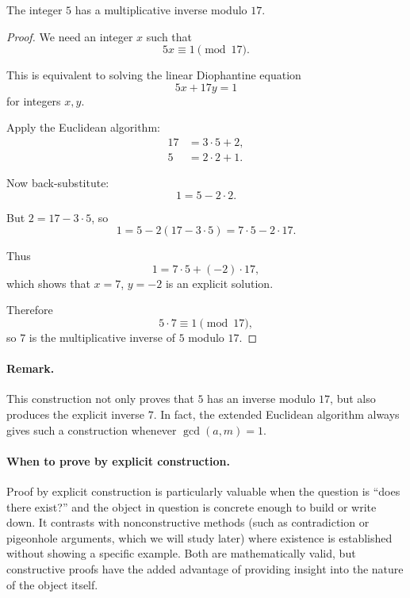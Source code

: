 \begin{theorem}
The integer $5$ has a multiplicative inverse modulo $17$.
\end{theorem}

\begin{proof}
We need an integer $x$ such that
\[
5x \equiv 1 \pmod{17}.
\]

This is equivalent to solving the linear Diophantine equation
\[
5x + 17y = 1
\]
for integers $x,y$.

Apply the Euclidean algorithm:
\begin{align*}
17 &= 3\cdot 5 + 2, \\
5  &= 2\cdot 2 + 1.
\end{align*}

Now back-substitute:
\[
1 = 5 - 2\cdot 2.
\]

But $2 = 17 - 3\cdot 5$, so
\[
1 = 5 - 2(17 - 3\cdot 5) = 7\cdot 5 - 2\cdot 17.
\]

Thus
\[
1 = 7\cdot 5 + (-2)\cdot 17,
\]
which shows that $x=7$, $y=-2$ is an explicit solution.

Therefore
\[
5\cdot 7 \equiv 1 \pmod{17},
\]
so $7$ is the multiplicative inverse of $5$ modulo $17$.
\end{proof}

\paragraph{Remark.}
This construction not only proves that $5$ has an inverse modulo $17$, but also
produces the explicit inverse $7$. In fact, the extended Euclidean algorithm
always gives such a construction whenever $\gcd(a,m)=1$.

\paragraph{When to prove by explicit construction.}
Proof by explicit construction is particularly valuable when the question is
``does there exist?'' and the object in question is concrete enough to build or
write down. It contrasts with nonconstructive methods (such as contradiction or
pigeonhole arguments, which we will study later) where existence is established without showing a specific
example. Both are mathematically valid, but constructive proofs have the added
advantage of providing insight into the nature of the object itself.


